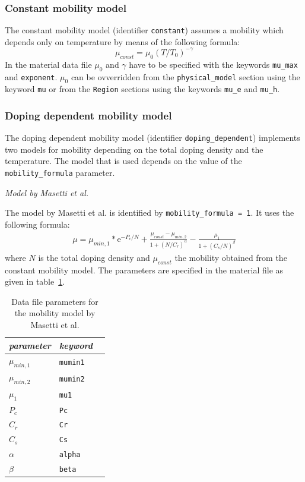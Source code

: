 \subsubsection{Constant mobility model}

The constant mobility model (identifier \texttt{constant}) assumes a mobility which depends only on temperature by means of the following formula:
\begin{equation}
\mu_{const} = \mu_0 (T/T_0)^{-\gamma}
\end{equation}
In the material data file $\mu_0$ and $\gamma$ have to be specified with the keywords \texttt{mu\_max} and \texttt{exponent}.
$\mu_0$ can be ovverridden from the \texttt{physical\_model} section using the keyword \texttt{mu} or from the \texttt{Region} sections using the keywords \texttt{mu\_e} and \texttt{mu\_h}.


\subsubsection{Doping dependent mobility model}

The doping dependent mobility model  (identifier \texttt{doping\_dependent}) implements two models for mobility depending on the total doping density and the temperature.
The model that is used depends on the value of the \verb+mobility_formula+ parameter.

\bigskip
\noindent\textsl{Model by Masetti et al.}~\cite{masetti}
\smallskip

\noindent The model by Masetti et al. is identified by \verb+mobility_formula = 1+.
It uses the following formula:
\begin{align}
\mu = \mu_{min,1} * \mathrm{e}^{-P_c/N} +
  \frac{\mu_{const} - \mu_{min,2}}{1 + (N/C_r)^\alpha} -
  \frac{\mu_1}{1 + (C_s/N)^\beta}
\end{align}
where $N$ is the total doping density and $\mu_{const}$ the mobility obtained from the constant mobility model.
The parameters are specified in the material file as given in table~\ref{table:mobility_masetti}.
\begin{table}[htb]
\center
\begin{tabular}{l||l|l}
\textit{parameter} & \textit{keyword}  \\
\hline\hline
$\mu_{min,1}$ &  \verb+mumin1+ \\
$\mu_{min,2}$ & \verb+mumin2+  \\
$\mu_1$ & \verb+mu1+  \\
$P_c$ & \verb+Pc+ \\
$C_r$ & \verb+Cr+ \\
$C_s$ & \verb+Cs+ \\
$\alpha$ & \verb+alpha+ \\
$\beta$ & \verb+beta+ \\
\end{tabular}
\caption{Data file parameters for the mobility model by Masetti et al.}
\label{table:mobility_masetti}
\end{table}



